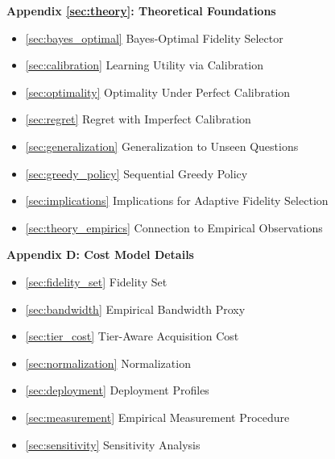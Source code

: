 \documentclass[11pt]{article}
\theoremstyle{plain}
\theoremstyle{definition}
\theoremstyle{remark}
\begin{document}
\vspace{0.5em}

\noindent\textbf{Appendix \ref{sec:theory}: Theoretical Foundations} \dotfill \pageref{sec:theory}
\begin{itemize}[leftmargin=2em, label={}]
    \item \ref{sec:bayes_optimal} Bayes-Optimal Fidelity Selector \dotfill \pageref{sec:bayes_optimal}
    \item \ref{sec:calibration} Learning Utility via Calibration \dotfill \pageref{sec:calibration}
    \item \ref{sec:optimality} Optimality Under Perfect Calibration \dotfill \pageref{sec:optimality}
    \item \ref{sec:regret} Regret with Imperfect Calibration \dotfill \pageref{sec:regret}
    \item \ref{sec:generalization} Generalization to Unseen Questions \dotfill \pageref{sec:generalization}
    \item \ref{sec:greedy_policy} Sequential Greedy Policy \dotfill \pageref{sec:greedy_policy}
    \item \ref{sec:implications} Implications for Adaptive Fidelity Selection \dotfill \pageref{sec:implications}
    \item \ref{sec:theory_empirics} Connection to Empirical Observations \dotfill \pageref{sec:theory_empirics}
\end{itemize}

\vspace{0.5em}

\noindent\textbf{Appendix D: Cost Model Details} \dotfill \pageref{sec:cost_model}
\begin{itemize}[leftmargin=2em, label={}]
    \item \ref{sec:fidelity_set} Fidelity Set \dotfill \pageref{sec:fidelity_set}
    \item \ref{sec:bandwidth} Empirical Bandwidth Proxy \dotfill \pageref{sec:bandwidth}
    \item \ref{sec:tier_cost} Tier-Aware Acquisition Cost \dotfill \pageref{sec:tier_cost}
    \item \ref{sec:normalization} Normalization \dotfill \pageref{sec:normalization}
    \item \ref{sec:deployment} Deployment Profiles \dotfill \pageref{sec:deployment}
    \item \ref{sec:measurement} Empirical Measurement Procedure \dotfill \pageref{sec:measurement}
    \item \ref{sec:sensitivity} Sensitivity Analysis \dotfill \pageref{sec:sensitivity}
\end{itemize}
\end{document}
